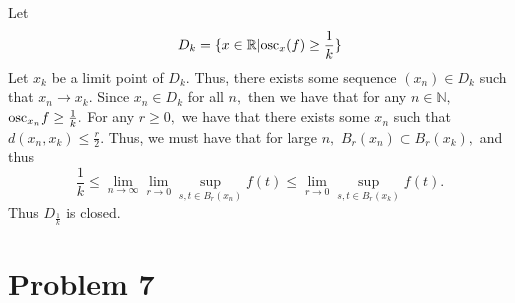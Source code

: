 \documentclass[11pt]{article}
\newcommand{\bbN}{\mathbb{N}}
\newcommand{\bbR}{\mathbb{R}}
\begin{document}
\begin{enumerate}
\begin{solution}
        Let \[D_k = \{x \in \bbR | \osc_x(f)\geq \frac{1}{k}\}\] Let $x_k$ be a limit point of $D_k.$ Thus, there exists some sequence $(x_n)\in D_k$ such that $x_n \to x_k.$ Since $x_n \in D_k$ for all $n,$ then we have that for any $n\in \bbN,$ $\text{osc}_{x_n}f \geq \frac{1}{k}.$ For any $r\geq 0,$ we have that there exists some $x_n$ such that $d(x_n, x_k)\leq \frac{r}{2}.$ Thus, we must have that for large $n,$ $B_{r}(x_n)\subset B_r(x_k),$ and thus
        \[\frac{1}{k}\leq \lim_{n\to \infty}\lim_{r\to 0}\sup_{s,t\in B_r(x_n)}f(t)\leq \lim_{r\to 0}\sup_{s,t\in B_r(x_k)}f(t).\] Thus $D_{\frac{1}{k}}$ is closed.
    \end{solution}
\end{enumerate}

\newpage
\section*{Problem 7}
\end{document}
